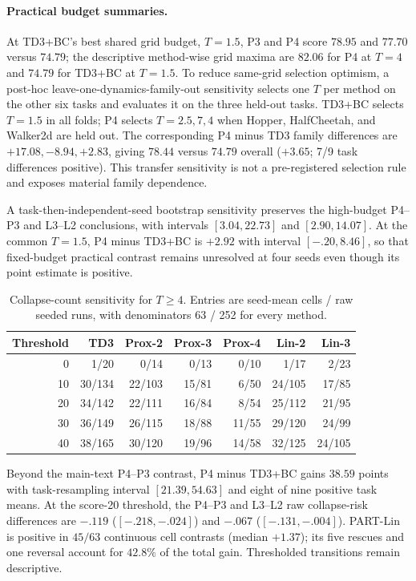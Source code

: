 \documentclass[twoside]{article}
\begin{document}
\paragraph{Practical budget summaries.}
At TD3+BC's best shared grid budget, $T=1.5$, P3 and P4 score $78.95$ and
$77.70$ versus $74.79$; the descriptive method-wise grid maxima are $82.06$
for P4 at $T=4$ and $74.79$ for TD3+BC at $T=1.5$. To reduce same-grid
selection optimism, a post-hoc leave-one-dynamics-family-out sensitivity
selects one $T$ per method on the other six tasks and evaluates it on the three
held-out tasks. TD3+BC selects $T=1.5$ in all folds; P4 selects $T=2.5,7,4$
when Hopper, HalfCheetah, and Walker2d are held out. The corresponding P4 minus
TD3 family differences are $+17.08,-8.94,+2.83$, giving $78.44$ versus
$74.79$ overall ($+3.65$; 7/9 task differences positive). This transfer
sensitivity is not a pre-registered selection rule and exposes material family
dependence.

A task-then-independent-seed bootstrap sensitivity preserves the high-budget
P4--P3 and L3--L2 conclusions, with intervals $[3.04,22.73]$ and
$[2.90,14.07]$. At the common $T=1.5$, P4 minus TD3+BC is $+2.92$ with
interval $[-.20,8.46]$, so that fixed-budget practical contrast remains
unresolved at four seeds even though its point estimate is positive.

\begin{table}[t]
\caption{Collapse-count sensitivity for $T\ge4$. Entries are seed-mean cells / raw seeded runs, with denominators 63 / 252 for every method.}
\centering
\small
\begin{tabular}{r|rrrrrr}
\toprule
Threshold & TD3 & Prox-2 & Prox-3 & Prox-4 & Lin-2 & Lin-3\\
\midrule
0  &1/20&0/14&0/13&0/10&1/17&2/23\\
10 &30/134&22/103&15/81&6/50&24/105&17/85\\
20 &34/142&22/111&16/84&8/54&25/112&21/95\\
30 &36/149&26/115&18/88&11/55&29/120&24/99\\
40 &38/165&30/120&19/96&14/58&32/125&24/105\\
\bottomrule
\end{tabular}
\label{tab:collapse_sensitivity}
\end{table}


Beyond the main-text P4--P3 contrast, P4 minus TD3+BC gains $38.59$ points
with task-resampling interval $[21.39,54.63]$ and eight of nine positive task
means. At the score-20 threshold, the P4--P3 and L3--L2 raw collapse-risk
differences are $-.119$ ($[-.218,-.024]$) and $-.067$ ($[-.131,-.004]$).
PART-Lin is positive in $45/63$ continuous cell contrasts (median $+1.37$);
its five rescues and one reversal account for $42.8\%$ of the total gain.
Thresholded transitions remain descriptive.
\end{document}
